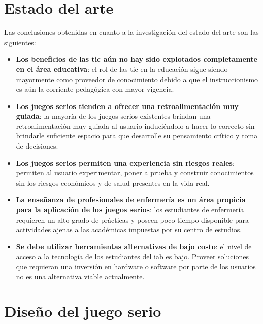 \section{Estado del arte}

Las conclusiones obtenidas en cuanto a la investigación del estado del arte son 
las siguientes:

\begin{itemize}

\item \textbf{Los beneficios de las \gls{tic} aún no hay sido explotados
        completamente en el área  educativa}: el rol de las \gls{tic} en la
    educación sigue siendo mayormente como proveedor de conocimiento debido a
    que el instruccionismo es aún la corriente pedagógica con mayor vigencia.

\item \textbf{Los juegos serios tienden a ofrecer una retroalimentación muy
        guiada}: la mayoría de los juegos serios existentes brindan una
    retroalimentación muy guiada al usuario induciéndolo a hacer lo correcto sin
    brindarle suficiente espacio para que desarrolle su pensamiento crítico y
    toma de decisiones.

\item \textbf{Los juegos serios permiten una experiencia sin riesgos reales}:
    permiten  al usuario experimentar, poner a prueba y construir conocimientos
    sin los riesgos económicos y de salud presentes en la vida real.

\item \textbf{La enseñanza de profesionales de enfermería es un área propicia
        para la aplicación de los juegos serios}: los estudiantes de enfermería
    requieren un alto grado de prácticas y poseen poco tiempo disponible para
    actividades ajenas a las académicas impuestas por su centro de estudios.

\item \textbf{Se debe utilizar herramientas alternativas de bajo costo}: el
    nivel de acceso a la tecnología de los estudiantes del \gls{iab} es bajo.
    Proveer soluciones que requieran una inversión en hardware o software por
    parte de los usuarios no es una alternativa viable actualmente.

\end{itemize}

\section{Diseño del juego serio}

